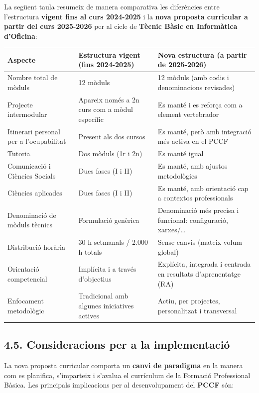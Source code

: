 \documentclass[
  paper=a4,
  ,captions=tableheading
]{scrartcl}
\begin{document}
La següent taula resumeix de manera comparativa les diferències entre
l'estructura \textbf{vigent fins al curs 2024-2025} i la \textbf{nova
proposta curricular a partir del curs 2025-2026} per al cicle de
\textbf{Tècnic Bàsic en Informàtica d'Oficina}:

\begin{longtable}[]{@{}lll@{}}
\toprule
\textbf{Aspecte} & \textbf{Estructura vigent (fins 2024-2025)} &
\textbf{Nova estructura (a partir de 2025-2026)} \\
\midrule
\endhead
Nombre total de mòduls & 12 mòduls & 12 mòduls (amb codis i
denominacions revisades) \\
Projecte intermodular & Apareix només a 2n curs com a mòdul específic &
Es manté i es reforça com a element vertebrador \\
Itinerari personal per a l'ocupabilitat & Present als dos cursos & Es
manté, però amb integració més activa en el PCCF \\
Tutoria & Dos mòduls (1r i 2n) & Es manté igual \\
Comunicació i Ciències Socials & Dues fases (I i II) & Es manté, amb
ajustos metodològics \\
Ciències aplicades & Dues fases (I i II) & Es manté, amb orientació cap
a contextos professionals \\
Denominació de mòduls tècnics & Formulació genèrica & Denominació més
precisa i funcional: configuració, xarxes/\ldots{} \\
Distribució horària & 30 h setmanals / 2.000 h totals & Sense canvis
(mateix volum global) \\
Orientació competencial & Implícita i a través d'objectius & Explícita,
integrada i centrada en resultats d'aprenentatge (RA) \\
Enfocament metodològic & Tradicional amb algunes iniciatives actives &
Actiu, per projectes, personalitzat i transversal \\
\bottomrule
\end{longtable}

\hypertarget{consideracions-per-a-la-implementaciuxf3}{%
\subsection{4.5. Consideracions per a la
implementació}\label{consideracions-per-a-la-implementaciuxf3}}

La nova proposta curricular comporta un \textbf{canvi de paradigma} en
la manera com es planifica, s'imparteix i s'avalua el currículum de la
Formació Professional Bàsica. Les principals implicacions per al
desenvolupament del \textbf{PCCF} són:
\end{document}
